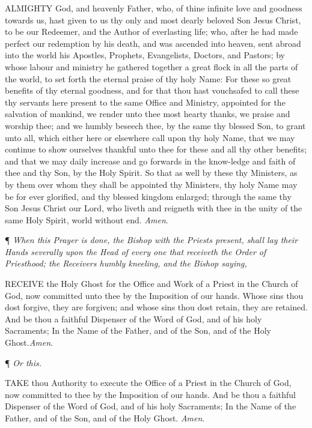 ALMIGHTY
God, and heavenly Father, who, of thine infinite love and goodness towards
us, hast given to us thy only and most dearly beloved Son Jesus Christ,
to be our Redeemer, and the Author of everlasting life; who, after he
had made perfect our redemption by his death, and was ascended into heaven,
sent abroad into the world his Apostles, Prophets, Evangelists, Doctors,
and Pastors; by whose labour and ministry he gathered together a great
flock in all the parts of the world, to set forth the eternal praise of
thy holy Name: For these so great benefits of thy eternal goodness, and
for that thou hast vouchsafed to call these thy servants here present
to the same Office and Ministry, appointed for the salvation of mankind,
we render unto thee most hearty thanks, we praise and worship thee; and
we humbly beseech thee, by the same thy blessed Son, to grant unto all,
which either here or elsewhere call upon thy holy Name, that we may continue
to show ourselves thankful unto thee for these and all thy other benefits;
and that we may daily increase and go forwards in the know-ledge and faith
of thee and thy Son, by the Holy Spirit. So that as well by these thy
Ministers, as by them over whom they shall be appointed thy Ministers,
thy holy Name may be for ever glorified, and thy blessed kingdom enlarged;
through the same thy Son Jesus Christ our Lord, who liveth and reigneth
with thee in the unity of the same Holy Spirit, world without end. \emph{Amen}.

¶ \emph{When this Prayer
is done, the Bishop with the Priests present, shall lay their Hands severally
upon the Head of every one that receiveth the Order of Priesthood; the
Receivers humbly kneeling, and the Bishop saying,}

RECEIVE the Holy Ghost
for the Office and Work of a Priest in the Church of God, now committed
unto thee by the Imposition of our hands. Whose sins thou dost forgive,
they are forgiven; and whose sins thou dost retain, they are retained.
And be thou a faithful Dispenser of the Word of God, and of his holy Sacraments;
In the Name of the Father, and of the Son, and of the Holy Ghost.\emph{Amen}.

¶ \emph{Or this.}

TAKE thou Authority to
execute the Office of a Priest in the Church of God, now committed to
thee by the Imposition of our hands. And be thou a faithful Dispenser
of the Word of God, and of his holy Sacraments; In the Name of the Father,
and of the Son, and of the Holy Ghost. \emph{Amen}.

